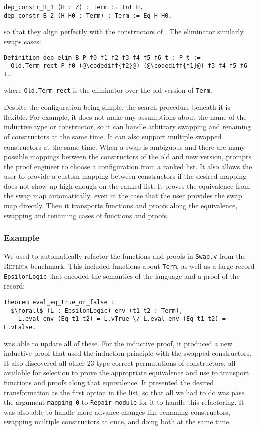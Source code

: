 \begin{lstlisting}
dep_constr_B_1 (H : Z) : Term := Int H.
dep_constr_B_2 (H H0 : Term) : Term := Eq H H0.
\end{lstlisting}
so that they align perfectly with the constructors of \A.
The eliminator similarly swaps cases:

\begin{lstlisting}
Definition dep_elim_B P f0 f1 f2 f3 f4 f5 f6 t : P t :=
  Old.Term_rect P f0 (@\codediff{f2}@) (@\codediff{f1}@) f3 f4 f5 f6 t.
\end{lstlisting}
where \lstinline{Old.Term_rect} is the eliminator over the old version of \lstinline{Term}.

Despite the configuration being simple, the search procedure beneath it is flexible.
For example, it does not make any assumptions about the name of the inductive type or constructor,
so it can handle arbitrary swapping and renaming of constructors at the same time.
It can also support multiple swapped constructors at the same time.
When a swap is ambiguous and there are many possible mappings between the constructors of the old
and new version, \toolname prompts the proof engineer to choose a configuration from a ranked list.
It also allows the user to provide a custom mapping between constructors if the desired mapping
does not show up high enough on the ranked list.
It proves the equivalence from the swap map automatically, even in the case that the user provides
the swap map directly.
Then it transports functions and proofs along the equivalence, swapping and renaming cases of functions
and proofs.

\subsubsection{Example}

We used \toolname to automatically refactor the functions and proofs in \lstinline{Swap.v} from the \textsc{Replica} benchmark.
This included functions about \lstinline{Term}, as well as a large record \lstinline{EpsilonLogic} that encoded the semantics of the language
and a proof of the record:

\begin{lstlisting}
Theorem eval_eq_true_or_false :
  $\forall$ (L : EpsilonLogic) env (t1 t2 : Term),
    L.eval env (Eq t1 t2) = L.vTrue \/ L.eval env (Eq t1 t2) = L.vFalse.
\end{lstlisting}
\toolname was able to update all of these. For the inductive proof, it produced
a new inductive proof that used the induction principle with the swapped constructors.
It also discovered all other 23 type-correct permutations of constructors, all available for selection to 
prove the appropriate equivalence and use to transport functions and proofs along that equivalence.
It presented the desired transformation as the first option in the list, so that all we had to do
was pass the argument \lstinline{mapping 0} to \lstinline{Repair module} for it to handle this refactoring.
It was also able to handle more advance changes like renaming constructors, swapping multiple constructors at once,
and doing both at the same time.

